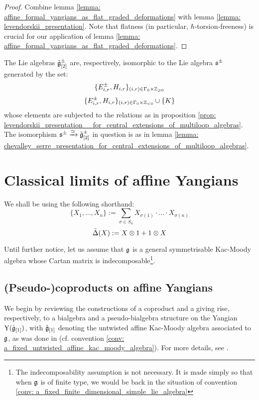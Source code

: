            \begin{proof}
                Combine lemma \ref{lemma: affine_formal_yangians_as_flat_graded_deformations} with lemma \ref{lemma: levendorskii_presentation}. Note that flatness (in particular, $\hbar$-torsion-freeness) is crucial for our application of lemma \ref{lemma: affine_formal_yangians_as_flat_graded_deformations}.
            \end{proof}
        \begin{corollary} \label{coro: levendorskii_presentation__for_central_extensions_of_multiloop_algebras}
            The Lie algebras $\tilde{\mathfrak{g}}_{[2]}^{\pm}$ are, respectively, isomorphic to the Lie algebra $\mathfrak{s}^{\pm}$ generated by the set:
                $$\{ E_{i, r}^{\pm}, H_{i, r} \}_{(i, r) \in \Gamma_0 \x \Z_{\geq 0}}$$
                $$\{ E_{i, r}^{\pm}, H_{i, r} \}_{(i, r) \in \Gamma_0 \x \Z_{< 0}} \cup \{K\}$$
            whose elements are subjected to the relations as in proposition \ref{prop: levendorskii_presentation__for_central_extensions_of_multiloop_algebras}. The isomorphism $\mathfrak{s}^{\pm} \xrightarrow[]{\simeq} \tilde{\mathfrak{g}}_{[2]}^{\pm}$ in question is as in lemma \ref{lemma: chevalley_serre_presentation_for_central_extensions_of_multiloop_algebras}.
        \end{corollary}

    \section{Classical limits of affine Yangians}
        \begin{convention}
            We shall be using the following shorthand:
                $$\{ X_1, ..., X_n \} := \sum_{\sigma \in S_n} X_{\sigma(1)} \cdot ... \cdot X_{\sigma(n)}$$
                $$\bar{\Delta}(X) := X \tensor 1 + 1 \tensor X$$
        \end{convention}

        \begin{convention} \label{conv: general_symmetrisable_kac_moody_algebra}
            Until further notice, let us assume that $\mathfrak{g}$ is a general symmetrisable Kac-Moody algebra whose Cartan matrix is indecomposable\footnote{The indecomposability assumption is not necessary. It is made simply so that when $\mathfrak{g}$ is of finite type, we would be back in the situation of convention \ref{conv: a_fixed_finite_dimensional_simple_lie_algebra}}.
        \end{convention}

        \subsection{(Pseudo-)coproducts on affine Yangians}
            We begin by reviewing the constructions of a coproduct and a  giving rise, respectively, to a bialgebra and a pseudo-bialgebra structure on the Yangian $\mathrm{Y}(\hat{\mathfrak{g}}_{[1]})$, with $\hat{\mathfrak{g}}_{[1]}$ denoting the untwisted affine Kac-Moody algebra associated to $\mathfrak{g}$, as was done in \cite[Chapter 7]{kac_infinite_dimensional_lie_algebras} (cf. convention \ref{conv: a_fixed_untwisted_affine_kac_moody_algebra}). For more details, see \cite[Sections 4, 5, and 6]{guay_nakajima_wendlandt_affine_yangian_coproduct}.
        
